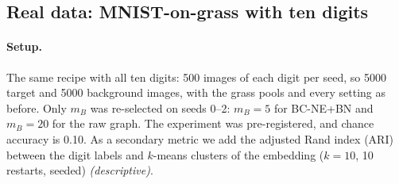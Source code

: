 \documentclass[10pt]{article}
\newcommand{\methodname}{BC-NE}
\newcommand{\BN}{\methodname{}+BN}
\newcommand{\cdesc}{\textit{\small (descriptive)}}
\begin{document}
\subsection{Real data: MNIST-on-grass with ten digits}
\label{sec:mnist09}

\paragraph{Setup.} The same recipe with all ten digits: 500 images of each digit per seed, so 5000 target and 5000 background images, with the grass pools and every setting as before. Only $m_B$ was re-selected on seeds 0--2: $m_B = 5$ for \BN{} and $m_B = 20$ for the raw graph. The experiment was pre-registered, and chance accuracy is 0.10. As a secondary metric we add the adjusted Rand index (ARI) between the digit labels and $k$-means clusters of the embedding ($k = 10$, 10 restarts, seeded) \cdesc.
\end{document}
